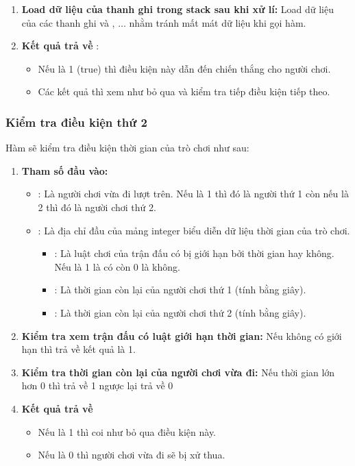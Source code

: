 \begin{enumerate}
\begin{itemize}
    \end{itemize}
    \item \textbf{Load dữ liệu của thanh ghi trong stack sau khi xử lí:} Load dữ liệu của các thanh ghi  và , \(\dots\) nhằm tránh mất mát dữ liệu khi gọi hàm.
\item \textbf{Kết quả trả về} : 
\begin{itemize}
\item Nếu là 1 (true) thì điều kiện này dẫn đến chiến thắng cho người chơi. 
\item Các kết quả thì xem như bỏ qua và kiểm tra tiếp điều kiện tiếp theo.
\end{itemize}
\end{enumerate}


\subsubsection{Kiểm tra điều kiện thứ 2}
Hàm  sẽ kiểm tra điều kiện thời gian của trò chơi như sau:
\begin{enumerate}
\item \textbf{Tham số đầu vào:} 
\begin{itemize}
\item {}: Là người chơi vừa đi lượt trên. Nếu là 1 thì đó là người thứ 1 còn nếu là 2 thì đó là người chơi thứ 2.
\item {}: Là địa chỉ đầu của mảng integer  biểu diễn dữ liệu thời gian của trò chơi.
\begin{itemize}
\item {}: Là luật chơi của trận đấu có bị giới hạn bởi thời gian hay không. Nếu là 1 là có còn 0 là không.
\item {}: Là thời gian còn lại của người chơi thứ 1 (tính bằng giây).
\item {}: Là thời gian còn lại của người chơi thứ 2 (tính bằng giây).
\end{itemize}
\end{itemize}
\item \textbf{Kiểm tra xem trận đấu có luật giới hạn thời gian:} Nếu không có giới hạn thì trả về kết quả là 1.
\item \textbf{Kiểm tra thời gian còn lại của người chơi vừa đi:} Nếu thời gian lớn hơn 0 thì trả về 1 ngược lại trả về 0
\item \textbf{Kết quả trả về} 
\begin{itemize}
\item Nếu là 1 thì coi như bỏ qua điều kiện này.
\item Nếu là 0 thì người chơi vừa đi sẽ bị xử thua.
\end{itemize}   
\end{enumerate}

